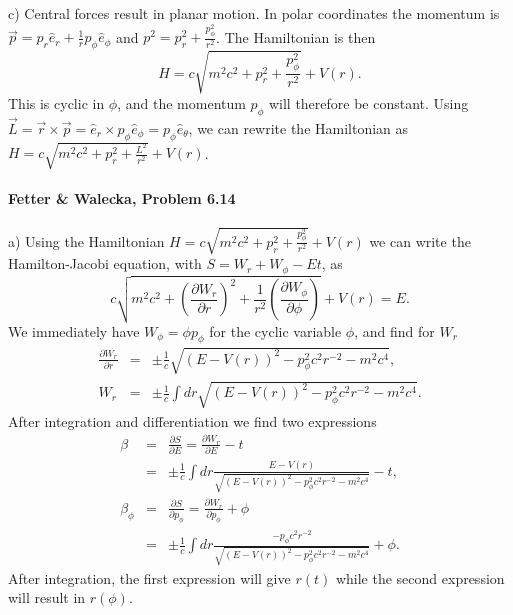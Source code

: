 \documentclass[letterpaper,11pt]{article}
\begin{document}
c) Central forces result in planar motion.  In polar coordinates the momentum is $\vec{p} = p_r \hat{e}_r + \frac{1}{r} p_\phi \hat{e}_\phi$ and $p^2 = p_r^2 + \frac{p_\phi^2}{r^2}$.  The Hamiltonian is then
\begin{equation*}
 H = c \sqrt{m^2 c^2 + p_r^2 + \frac{p_\phi^2}{r^2}} + V(r).
\end{equation*}
This is cyclic in $\phi$, and the momentum $p_\phi$ will therefore be constant.  Using $\vec{L} = \vec{r} \times \vec{p} = \hat{e}_r \times p_\phi \hat{e}_\phi = p_\phi \hat{e}_\theta$, we can rewrite the Hamiltonian as $H = c \sqrt{m^2 c^2 + p_r^2 + \frac{L^2}{r^2}} + V(r)$.

\paragraph*{Fetter \& Walecka, Problem 6.14}
a) Using the Hamiltonian $H = c \sqrt{m^2 c^2 + p_r^2 + \frac{p_\phi^2}{r^2}} + V(r)$ we can write the Hamilton-Jacobi equation, with $S = W_r + W_\phi - E t$, as
\begin{equation*}
 c \sqrt{m^2 c^2 + \left(\frac{\partial W_r}{\partial r}\right)^2 + \frac{1}{r^2} \left(\frac{\partial W_\phi}{\partial \phi}\right)} + V(r) = E.
\end{equation*}
We immediately have $W_\phi = \phi p_\phi$ for the cyclic variable $\phi$, and find for $W_r$
\begin{eqnarray*}
 \frac{\partial W_r}{\partial r} & = & \pm \frac{1}{c} \sqrt{\left(E - V(r)\right)^2 - p_\phi^2 c^2 r^{-2} - m^2 c^4}, \\
 W_r & = & \pm \frac{1}{c} \int dr \sqrt{\left(E - V(r)\right)^2 - p_\phi^2 c^2 r^{-2} - m^2 c^4}.
\end{eqnarray*}
After integration and differentiation we find two expressions
\begin{eqnarray*}
 \beta & = & \frac{\partial S}{\partial E} = \frac{\partial W_r}{\partial E} - t \\
       & = & \pm \frac{1}{c} \int dr \frac{E - V(r)}{\sqrt{\left(E - V(r)\right)^2 - p_\phi^2 c^2 r^{-2} - m^2 c^4}} - t, \\
 \beta_\phi & = & \frac{\partial S}{\partial p_\phi} = \frac{\partial W_r}{\partial p_\phi} + \phi \\
       & = & \pm \frac{1}{c} \int dr \frac{-p_\phi c^2 r^{-2}}{\sqrt{\left(E - V(r)\right)^2 - p_\phi^2 c^2 r^{-2} - m^2 c^4}} + \phi.
\end{eqnarray*}
After integration, the first expression will give $r(t)$ while the second expression will result in $r(\phi)$.
\end{document}

